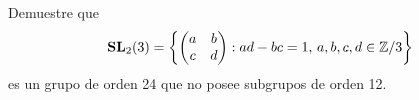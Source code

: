 \begin{exercise}
Demuestre que 
\[
\mathbf{SL}_2(3)=\left\{\begin{pmatrix}a&b\\c&d\end{pmatrix}:ad-bc=1,\,a,b,c,d\in\mathbb{Z}/3\right\}
\]
es un grupo de orden 24 que no posee subgrupos de orden 12.	
\end{exercise}


%


%
%



